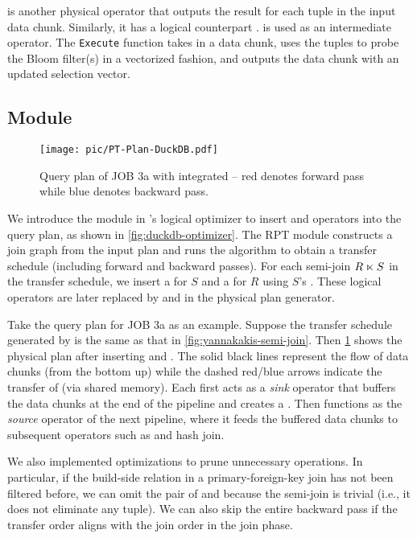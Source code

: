 \UseBF is another physical operator that outputs the \BF result for each tuple in the input data chunk. Similarly, it has a logical counterpart \LogicalUseBF. \UseBF is used as an intermediate operator. The \texttt{Execute} function takes in a data chunk, uses the tuples to probe the Bloom filter(s) in a vectorized fashion, and outputs the data chunk with an updated selection vector.


\subsection{\RPT Module}
\label{sec:impl:rpt}

\begin{figure}[t!]
    \centering
    \texttt{[image: pic/PT-Plan-DuckDB.pdf]}
    \caption{Query plan of JOB 3a with \RPT integrated \textnormal{-- red denotes forward pass while blue denotes backward pass.}}
    \label{fig:pt-plan}
\end{figure}

We introduce the \RPT module in \duckdb's logical optimizer to insert \LogicalCreateBF and \LogicalUseBF operators into the query plan, as shown in \cref{fig:duckdb-optimizer}. The RPT module constructs a join graph from the input plan and runs the \TreeStruct algorithm to obtain a transfer schedule (including forward and backward passes). For each semi-join $R \ltimes S$ in the transfer schedule, we insert a \LogicalCreateBF for $S$ and a \LogicalUseBF for $R$ using $S$'s \BF. These logical operators are later replaced by \CreateBF and \UseBF in the physical plan generator.

Take the query plan for JOB 3a as an example. Suppose the transfer schedule generated by \TreeStruct is the same as that in \cref{fig:yannakakis-semi-join}. Then \cref{fig:pt-plan} shows the physical plan after inserting \CreateBF and \UseBF. The solid black lines represent the flow of data chunks (from the bottom up) while the dashed red/blue arrows indicate the transfer of \BFs (via shared memory). Each \CreateBF first acts as a \emph{sink} operator that buffers the data chunks at the end of the pipeline and creates a \BF. Then \CreateBF functions as the \emph{source} operator of the next pipeline, where it feeds the buffered data chunks to subsequent operators such as \UseBF and hash join.

We also implemented optimizations to prune unnecessary \BF operations. In particular, if the build-side relation in a primary-foreign-key join has not been filtered before, we can omit the pair of \CreateBF and \UseBF because the semi-join is trivial (i.e., it does not eliminate any tuple). We can also skip the entire backward pass if the transfer order aligns with the join order in the join phase.
